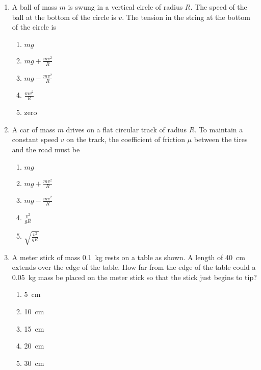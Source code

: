 \documentclass{../../oss-apphys}
\begin{document}
\begin{multicols}{2}
\begin{enumerate}[leftmargin=18pt]
  \item A ball of mass $m$ is swung in a vertical circle of radius $R$. The
    speed of the ball at the bottom of the circle is $v$. The tension in the
    string at the bottom of the circle is
    \begin{enumerate}[noitemsep,topsep=0pt,leftmargin=18pt,label=(\Alph*)]
    \item $\displaystyle mg$
    \item $\displaystyle mg+\frac{mv^2}{R}$
    \item $\displaystyle mg-\frac{mv^2}{R}$
    \item $\displaystyle \frac{mv^2}{R}$
    \item zero
    \end{enumerate}

  \item A car of mass $m$ drives on a flat circular track of radius $R$. To
    maintain a constant speed $v$ on the track, the coefficient of friction
    $\mu$ between the tires and the road must be
    \begin{enumerate}[noitemsep,topsep=0pt,leftmargin=18pt,label=(\Alph*)]
    \item $\displaystyle mg$
    \item $\displaystyle mg+\frac{mv^2}{R}$
    \item $\displaystyle mg-\frac{mv^2}{R}$
    \item $\displaystyle \frac{v^2}{gR}$
    \item $\displaystyle \sqrt{\frac{v^2}{gR}}$
    \end{enumerate}
    \columnbreak
    
  \item A meter stick of mass \SI{.1}{\kilo\gram} rests on a table as shown. A
    length of \SI{40}{\centi\metre} extends over the edge of the table. How far
    from the edge of the table could a \SI{.05}{\kilo\gram} mass be placed on
    the meter stick so that the stick just begins to tip?
    \begin{center}
      \vspace{-.2in}
    \end{center}
    \begin{enumerate}[noitemsep,topsep=0pt,leftmargin=18pt,label=(\Alph*)]
    \item\SI{5}{\centi\metre}
    \item\SI{10}{\centi\metre}
    \item\SI{15}{\centi\metre}
    \item\SI{20}{\centi\metre}
    \item\SI{30}{\centi\metre}
    \end{enumerate}


\end{enumerate}
\end{multicols}
\end{document}
